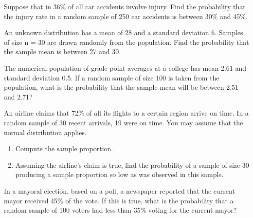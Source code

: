 \vspace*{6\baselineskip}

\begin{example}

Suppose that in 36\% of all car accidents involve injury. Find the
probability that the injury rate in a random sample of 250 car accidents
is between 30\% and 45\%.

\end{example}

\vspace*{6\baselineskip}

\begin{exercise}

An unknown distribution has a mean of 28 and a standard deviation 6.
Samples of size n = 30 are drawn randomly from the population. Find the
probability that the sample mean is between 27 and 30.

\end{exercise}

\vspace*{6\baselineskip}

\begin{exercise}

The numerical population of grade point averages at a college has mean
2.61 and standard deviation 0.5. If a random sample of size 100 is taken
from the population, what is the probability that the sample mean will
be between 2.51 and 2.71?

\end{exercise}

\vspace*{6\baselineskip}

\begin{exercise}

An airline claims that 72\% of all its flights to a certain region
arrive on time. In a random sample of 30 recent arrivals, 19 were on
time. You may assume that the normal distribution applies.

\begin{enumerate}
\item
  Compute the sample proportion.
\item
  Assuming the airline's claim is true, find the probability of a sample
  of size 30 producing a sample proportion so low as was observed in
  this sample.
\end{enumerate}

\end{exercise}

\begin{exercise}

In a mayoral election, based on a poll, a newspaper reported that the
current mayor received 45\% of the vote. If this is true, what is the
probability that a random sample of 100 voters had less than 35\% voting
for the current mayor?

\end{exercise}

